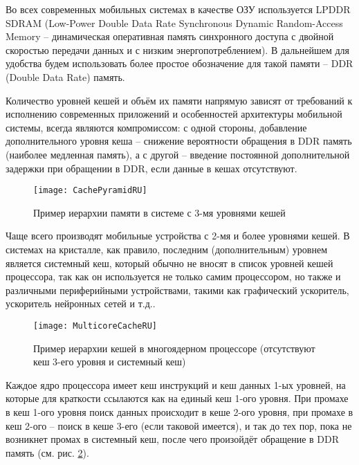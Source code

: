     Во всех современных мобильных системах в качестве ОЗУ используется LPDDR SDRAM
    (Low-Power Double Data Rate Synchronous Dynamic Random-Access Memory --
    динамическая оперативная память синхронного доступа с двойной скоростью передачи данных и
    с низким энергопотреблением). В дальнейшем для удобства будем использовать более простое
    обозначение для такой памяти -- DDR (Double Data Rate) память.

    Количество уровней кешей и объём их памяти напрямую зависят от требований к исполнению
    современных приложений и особенностей архитектуры мобильной системы,
    всегда являются компромиссом: с одной стороны, добавление дополнительного
    уровня кеша -- снижение вероятности обращения в DDR память (наиболее медленная память),
    а с другой -- введение постоянной дополнительной задержки при обращении в DDR, если данные
    в кешах отсутствуют.

    \begin{figure}[!h]
        \caption{Пример иерархии памяти в системе с 3-мя уровнями кешей}
        \centering
        \texttt{[image: CachePyramidRU]}
        \label{CachePyramid}
    \end{figure}

    Чаще всего производят мобильные устройства с 2-мя и более уровнями кешей. В системах на кристалле,
    как правило, последним (дополнительным) уровнем является системный кеш, который обычно
    не вносят в список уровней кешей процессора, так как он используется не только самим процессором,
    но также и различными периферийными устройствами, такими как графический ускоритель, ускоритель
    нейронных сетей и т.д..

    \begin{figure}[!h]
        \caption{Пример иерархии кешей в многоядерном процессоре (отсутствуют кеш 3-его уровня
            и системный кеш)}
        \centering
        \texttt{[image: MulticoreCacheRU]}
        \label{MulticoreCache}
    \end{figure}

    Каждое ядро процессора имеет кеш инструкций и кеш данных 1-ых уровней, на которые для краткости
    ссылаются как на единый кеш 1-ого уровня.
    При промахе в кеш 1-ого уровня поиск данных происходит в кеше 2-ого уровня, при промахе
    в кеш 2-ого -- поиск в кеше 3-его (если таковой имеется), и так до тех пор, пока не возникнет
    промах в системный кеш, после чего произойдёт обращение в DDR память
    (см. рис. \ref{MulticoreCache}).


